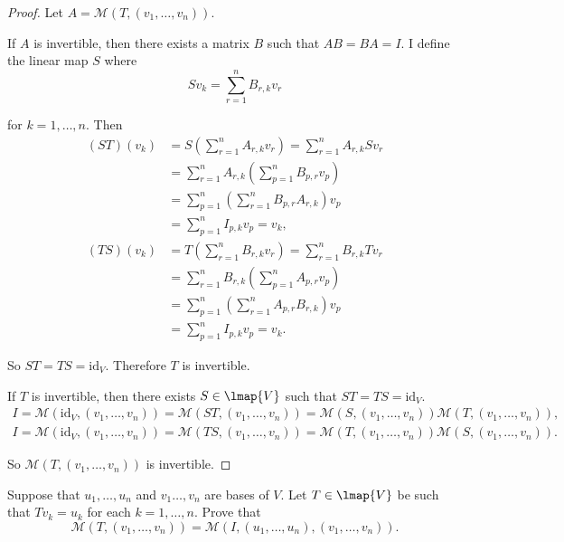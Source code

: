 \begin{proof}
    Let $A = \mathcal{M}(T, (v_{1}, \ldots, v_{n}))$.

    If $A$ is invertible, then there exists a matrix $B$ such that $AB = BA = I$. I define the linear map $S$ where
    \[
        Sv_{k} = \sum^{n}_{r=1}B_{r,k}v_{r}
    \]

    for $k = 1, \ldots, n$. Then
    \begin{align*}
        (ST)(v_{k}) & = S\left(\sum^{n}_{r=1}A_{r,k}v_{r} \right) = \sum^{n}_{r=1}A_{r,k}Sv_{r} \\
                    & = \sum^{n}_{r=1}A_{r,k}\left(\sum^{n}_{p=1}B_{p,r}v_{p}\right)            \\
                    & = \sum^{n}_{p=1}\left(\sum^{n}_{r=1}B_{p,r}A_{r,k}\right)v_{p}            \\
                    & = \sum^{n}_{p=1}I_{p,k}v_{p} = v_{k},                                     \\
        (TS)(v_{k}) & = T\left(\sum^{n}_{r=1}B_{r,k}v_{r}\right) = \sum^{n}_{r=1}B_{r,k}Tv_{r}  \\
                    & = \sum^{n}_{r=1}B_{r,k}\left(\sum^{n}_{p=1}A_{p,r}v_{p}\right)            \\
                    & = \sum^{n}_{p=1}\left(\sum^{n}_{r=1}A_{p,r}B_{r,k}\right)v_{p}            \\
                    & = \sum^{n}_{p=1}I_{p,k}v_{p} = v_{k}.
    \end{align*}

    So $ST = TS = \text{id}_{V}$. Therefore $T$ is invertible.

    If $T$ is invertible, then there exists $S\in\lmap{V}$ such that $ST = TS = \text{id}_{V}$.
    \[
        \begin{split}
            I = \mathcal{M}(\text{id}_{V}, (v_{1}, \ldots, v_{n})) = \mathcal{M}(ST, (v_{1}, \ldots, v_{n})) = \mathcal{M}(S, (v_{1}, \ldots, v_{n}))\mathcal{M}(T, (v_{1}, \ldots, v_{n})), \\
            I = \mathcal{M}(\text{id}_{V}, (v_{1}, \ldots, v_{n})) = \mathcal{M}(TS, (v_{1}, \ldots, v_{n})) = \mathcal{M}(T, (v_{1}, \ldots, v_{n}))\mathcal{M}(S, (v_{1}, \ldots, v_{n})).
        \end{split}
    \]

    So $\mathcal{M}(T, (v_{1}, \ldots, v_{n}))$ is invertible.
\end{proof}
\newpage

\begin{exercise}
    Suppose that $u_{1}, \ldots, u_{n}$ and $v_{1} \ldots, v_{n}$ are bases of $V$. Let $T\in\lmap{V}$ be such that $Tv_{k} = u_{k}$ for each $k = 1,\ldots, n$. Prove that
    \[
        \mathcal{M}(T, (v_{1}, \ldots, v_{n})) = \mathcal{M}(I, (u_{1}, \ldots, u_{n}), (v_{1}, \ldots, v_{n})).
    \]
\end{exercise}

